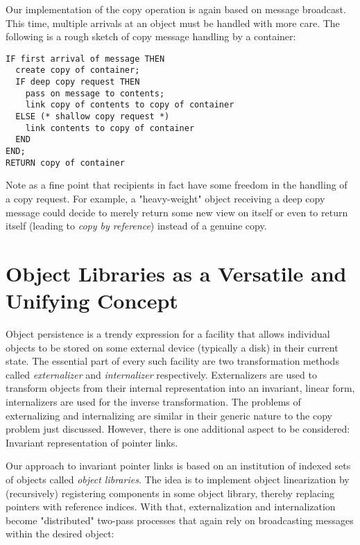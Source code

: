 \ein
Our implementation of the copy operation is again based on message broadcast.
This time, multiple arrivals at an object must be handled with more care. The
following is a rough sketch of copy message handling by a container:

{\small\begin{verbatim}
IF first arrival of message THEN
  create copy of container;
  IF deep copy request THEN
    pass on message to contents;
    link copy of contents to copy of container
  ELSE (* shallow copy request *)
    link contents to copy of container
  END
END;
RETURN copy of container
\end{verbatim}}

Note as a fine point that recipients in fact have some freedom in the handling
of a copy request. For example, a "heavy-weight" object receiving a deep copy
message could decide to merely return some new view on itself or even to
return
itself (leading to {\em copy by reference\/}) instead of a genuine copy.

\section{Object Libraries as a Versatile and Unifying Concept}

Object persistence is a trendy expression for a facility that allows
individual
objects to be stored on some external device (typically a disk) in their
current
state. The essential part of every such facility are two transformation
methods
called {\em externalizer} and {\em internalizer} respectively. Externalizers
are used to transform objects from their internal representation into an
invariant, linear form, internalizers are used for the inverse transformation.
The problems of externalizing and internalizing are similar in their generic
nature to the copy
problem just discussed. However, there is one additional aspect to be
considered:
Invariant representation of pointer links.

\ein
Our approach to invariant pointer links is based on an institution of indexed
sets of objects called {\em object libraries}. The idea is to implement object
linearization by (recursively) registering components in some object library,
thereby replacing pointers with reference indices. With that, externalization
and internalization become "distributed" two-pass processes that again rely
on broadcasting messages within the desired object:


